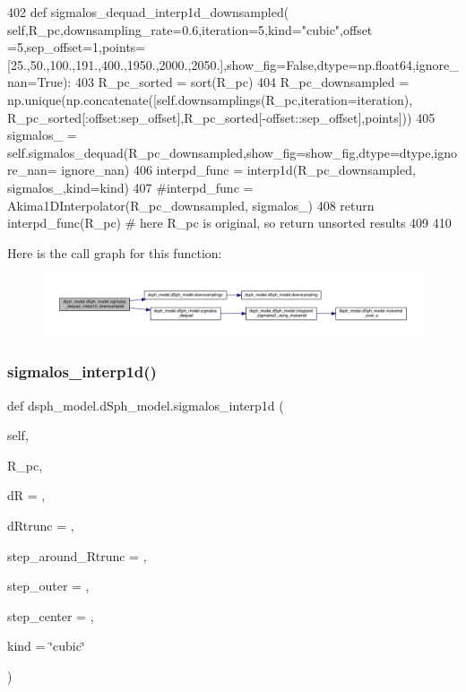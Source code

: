 \begin{DoxyCode}
402     \textcolor{keyword}{def }sigmalos\_dequad\_interp1d\_downsampled(
      self,R\_pc,downsampling\_rate=0.6,iteration=5,kind="cubic",offset
      =5,sep\_offset=1,points=[25.,50.,100.,191.,400.,1950.,2000.,2050.],show\_fig=False,dtype=np.float64,ignore\_nan=True):
403         R\_pc\_sorted = sort(R\_pc)
404         R\_pc\_downsampled = np.unique(np.concatenate([self.downsamplings(R\_pc,iteration=iteration),
      R\_pc\_sorted[:offset:sep\_offset],R\_pc\_sorted[-offset::sep\_offset],points]))
405         sigmalos\_ = self.sigmalos\_dequad(R\_pc\_downsampled,show\_fig=show\_fig,dtype=dtype,ignore\_nan=
      ignore\_nan)
406         interpd\_func = interp1d(R\_pc\_downsampled, sigmalos\_,kind=kind)
407         \textcolor{comment}{#interpd\_func = Akima1DInterpolator(R\_pc\_downsampled, sigmalos\_)}
408         \textcolor{keywordflow}{return} interpd\_func(R\_pc) \textcolor{comment}{# here R\_pc is original, so return unsorted results}
409         
410     
\end{DoxyCode}
Here is the call graph for this function\+:\nopagebreak
\begin{figure}[H]
\begin{center}
\leavevmode
\includegraphics[width=350pt]{d0/d25/classdsph__model_1_1dSph__model_a0046cd7677792835d8cfafe83dbe276c_cgraph}
\end{center}
\end{figure}
\mbox{\label{classdsph__model_1_1dSph__model_ad105b90e1827d25804eb3d7a3ba96f28}} 
\subsubsection{\texorpdfstring{sigmalos\+\_\+interp1d()}{sigmalos\_interp1d()}}
{\footnotesize\ttfamily def dsph\+\_\+model.\+d\+Sph\+\_\+model.\+sigmalos\+\_\+interp1d (\begin{DoxyParamCaption}\item[{}]{self,  }\item[{}]{R\+\_\+pc,  }\item[{}]{dR = {},  }\item[{}]{d\+Rtrunc = {},  }\item[{}]{step\+\_\+around\+\_\+\+Rtrunc = {},  }\item[{}]{step\+\_\+outer = {},  }\item[{}]{step\+\_\+center = {},  }\item[{}]{kind = {\ttfamily \char`\"{}cubic\char`\"{}} }\end{DoxyParamCaption})}

